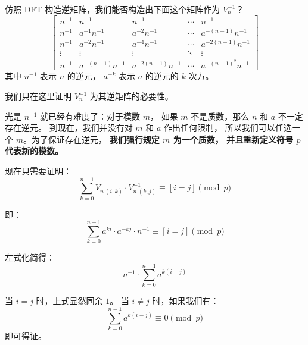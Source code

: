 \documentclass[12pt, UTF8]{article}
\begin{document}
    \bigskip
    仿照 DFT 构造逆矩阵，我们能否构造出下面这个矩阵作为 $V_n^{-1}$？
    \begin{equation*}
        \begin{bmatrix}
            n^{-1} & n^{-1} & n^{-1} & \cdots & n^{-1}
            \\
            n^{-1} & a^{-1}n^{-1} & a^{-2}n^{-1} & \cdots & a^{-(n - 1)}n^{-1}
            \\
            n^{-1} & a^{-2}n^{-1} & a^{-4}n^{-1} & \cdots & a^{-2(n - 1)}n^{-1}
            \\
            \vdots & \vdots & \vdots & \ddots & \vdots
            \\
            n^{-1} & a^{-(n - 1)}n^{-1} & a^{-2(n - 1)}n^{-1} &
            \cdots & a^{-(n - 1)^2}n^{-1}
        \end{bmatrix}
    \end{equation*}
    其中 $n^{-1}$ 表示 $n$ 的逆元，
    $a^{-k}$ 表示 $a$ 的逆元的 $k$ 次方。

    我们只在这里证明 $V_n^{-1}$ 为其逆矩阵的必要性。

    \bigskip
    光是 $n^{-1}$ 就已经有难度了：对于模数 $m$，
    如果 $m$ 不是质数，那么 $n$ 和 $a$ 不一定存在逆元。
    到现在，我们并没有对 $m$ 和 $a$ 作出任何限制，
    所以我们可以任选一个 $m$。为了保证存在逆元，
    \textbf{我们强行规定 $m$ 为一个质数，
    并且重新定义符号 $p$ 代表新的模数。}

    \bigskip
    现在只需要证明：
    \begin{equation*}
        \sum_{k = 0}^{n - 1} V_{n ~ (i, k)} · V^{-1}_{n ~ (k, j)}
        \equiv
        [i = j]
        \pmod {p}
    \end{equation*}

    即：
    \begin{equation*}
        \sum_{k = 0}^{n - 1} a^{ki} · a^{-kj} · n^{-1}
        \equiv
        [i = j]
        \pmod {p}
    \end{equation*}

    左式化简得：
    \begin{equation*}
        n^{-1} · \sum_{k = 0}^{n - 1} a^{k(i - j)}
    \end{equation*}

    当 $i = j$ 时，上式显然同余 $1$。
    当 $i \ne j$ 时，如果我们有：
    \begin{equation*}
        \sum_{k = 0}^{n - 1} a^{k(i - j)} \equiv 0 \pmod {p}
    \end{equation*}
    即可得证。
\end{document}
